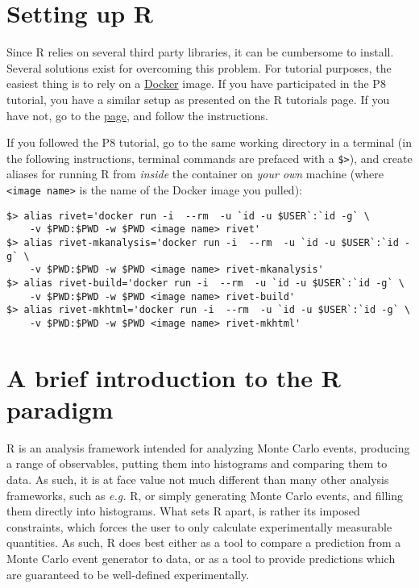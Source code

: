 \documentclass[11pt]{article}
\def\eg{\emph{e.g.}\xspace}
\newcommand{\pythia}{P\protect\scalebox{0.8}{YTHIA}8\xspace}
\newcommand{\rivet}{R\protect\scalebox{0.8}{IVET}\xspace}
\newcommand{\eic}{\protect\scalebox{0.8}{EIC}\xspace}
\newcommand{\rooot}{R\protect\scalebox{0.8}{oot}\xspace}
\begin{document}
\section{Setting up \rivet}
\label{sec:setup}
Since \rivet relies on several third party libraries, it can be cumbersome to install. Several solutions exist for overcoming this problem. For tutorial purposes, the easiest thing is to rely on a \href{https://www.docker.com/}{Docker} image. If you have participated in the \eic \pythia tutorial, you have a similar setup as presented on the \rivet tutorials page. If you have not, go to the \href{https://gitlab.com/hepcedar/rivet/-/blob/master/doc/tutorials/docker.md}{page}, and follow the instructions.

If you followed the \pythia tutorial, go to the same working directory in a terminal (in the following instructions, terminal commands are prefaced with a \texttt{\$>}), and create aliases for running \rivet from \textit{inside} the container on \textit{your own} machine (where \texttt{<image name>} is the name of the Docker image you pulled):
\begin{verbatim}
$> alias rivet='docker run -i  --rm  -u `id -u $USER`:`id -g` \
    -v $PWD:$PWD -w $PWD <image name> rivet'
$> alias rivet-mkanalysis='docker run -i  --rm  -u `id -u $USER`:`id -g` \
    -v $PWD:$PWD -w $PWD <image name> rivet-mkanalysis'
$> alias rivet-build='docker run -i  --rm  -u `id -u $USER`:`id -g` \
    -v $PWD:$PWD -w $PWD <image name> rivet-build'
$> alias rivet-mkhtml='docker run -i  --rm  -u `id -u $USER`:`id -g` \
    -v $PWD:$PWD -w $PWD <image name> rivet-mkhtml'
\end{verbatim}

\section{A brief introduction to the \rivet paradigm}
\rivet is an analysis framework intended for analyzing Monte Carlo events, producing a range of observables, putting them into histograms and comparing them to data. As such, it is at face value not much different than many other analysis frameworks, such as \eg \rooot, or simply generating Monte Carlo events, and filling them directly into histograms. What sets \rivet apart, is rather its imposed constraints, which forces the user to only calculate experimentally measurable quantities. As such, \rivet does best either as a tool to compare a prediction from a Monte Carlo event generator to data, or as a tool to provide predictions which are guaranteed to be well-defined experimentally.
\end{document}
